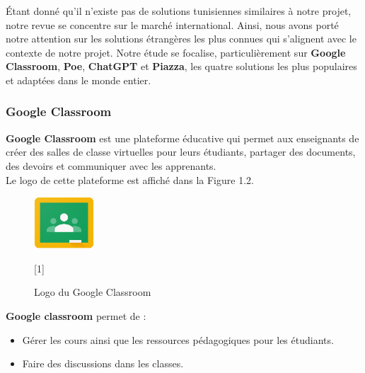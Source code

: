 \vspace{0.5em}
\noindent Étant donné qu’il n’existe pas de solutions tunisiennes similaires à notre projet, notre revue se concentre sur le marché international. Ainsi, nous avons porté notre attention sur les solutions étrangères les plus connues qui s'alignent avec le contexte de notre projet. Notre étude se focalise, particulièrement sur \textbf{Google Classroom}, \textbf{Poe}, \textbf{ChatGPT} et \textbf{Piazza}, les quatre solutions les plus populaires et adaptées dans le monde entier.

\subsubsection{Google Classroom}
\textbf{Google Classroom} est une plateforme éducative qui permet aux enseignants de créer des salles de classe virtuelles pour leurs étudiants, partager des documents, des devoirs et communiquer avec les apprenants.\\
Le logo de cette plateforme est affiché dans la Figure 1.2.
\begin{figure}[H]
    \centering
    \includegraphics[width=0.2\textwidth]{images/google-classroom-logo.png}
    \caption{Logo du Google Classroom}[1]
    \label{fig:google-classroom-logo}
\end{figure}
\noindent \textbf{Google classroom} permet de :
    \begin{itemize}[itemsep=1pt, parsep=1pt]
        \item Gérer les cours ainsi que les ressources pédagogiques pour les étudiants.
        \item Faire des discussions dans les classes.
    \end{itemize}

